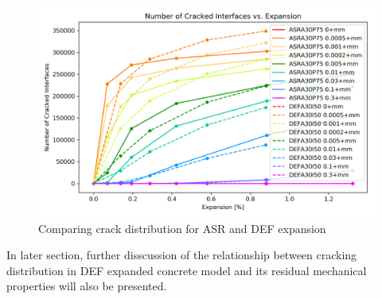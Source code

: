 \begin{figure}[ht!]
\centering
\includegraphics[width=.8\linewidth]{Files/exp_3D/Compare.png}
  \caption{Comparing crack distribution for ASR and DEF expansion}
  \label{compare}
\end{figure}

In later section, further disscussion of the relationship between cracking distribution in DEF expanded concrete model and its residual mechanical properties will also be presented.
